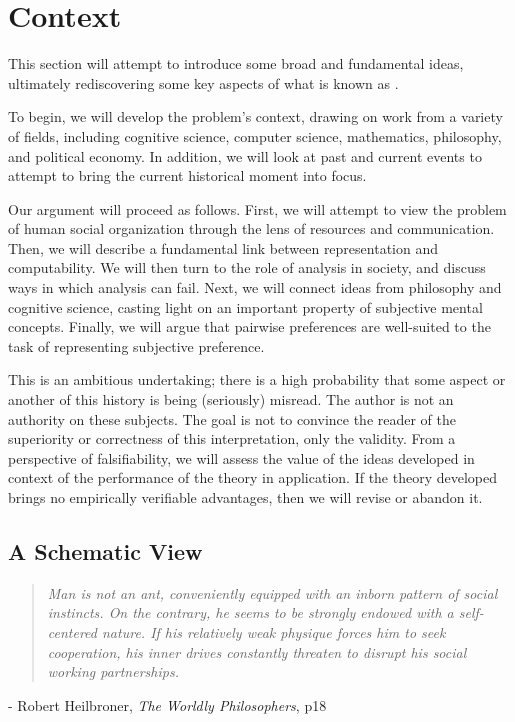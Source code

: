 \documentclass[12pt]{book}
\begin{document}
\section{Context}

This section will attempt to introduce some broad and fundamental ideas, ultimately rediscovering some key aspects of what is known as .

To begin, we will develop the problem's context, drawing on work from a variety of fields, including cognitive science, computer science, mathematics, philosophy, and political economy.
In addition, we will look at past and current events to attempt to bring the current historical moment into focus.

\bigskip

Our argument will proceed as follows.
First, we will attempt to view the problem of human social organization through the lens of resources and communication.
Then, we will describe a fundamental link between representation and computability.
We will then turn to the role of analysis in society, and discuss ways in which analysis can fail.
Next, we will connect ideas from philosophy and cognitive science, casting light on an important property of subjective mental concepts.
Finally, we will argue that pairwise preferences are well-suited to the task of representing subjective preference.

\bigskip

This is an ambitious undertaking; there is a high probability that some aspect or another of this history is being (seriously) misread.
The author is not an authority on these subjects.
The goal is not to convince the reader of the superiority or correctness of this interpretation, only the validity.
From a perspective of falsifiability, we will assess the value of the ideas developed in context of the performance of the theory in application.
If the theory developed brings no empirically verifiable advantages, then we will revise or abandon it.

\subsection{A Schematic View}

\begin{center}
\begin{quotation}
\textit{	Man is not an ant, conveniently equipped with an inborn pattern of social instincts.
	On the contrary, he seems to be strongly endowed with a self-centered nature.
	If his relatively weak physique forces him to seek cooperation, his inner drives constantly threaten to disrupt his social working partnerships.}
\end{quotation}
	- Robert Heilbroner, \textit{The Worldly Philosophers}, p18
\end{center}
\end{document}
